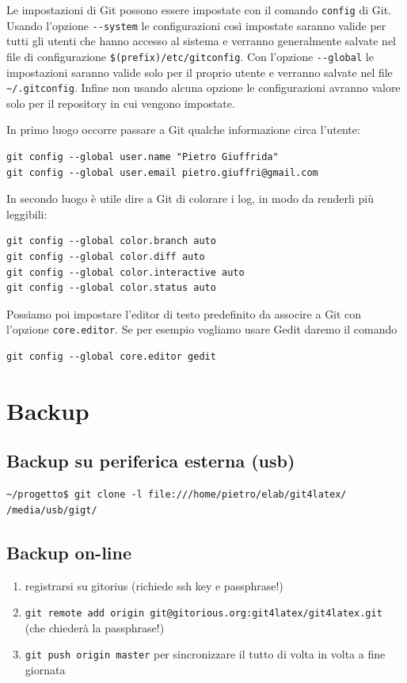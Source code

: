 \documentclass[a4paper,12pt,oneside]{article}
\begin{document}
Le impostazioni di Git possono essere impostate con il comando
\lstinline|config| di Git. Usando l'opzione \lstinline|--system| le configurazioni
così impostate saranno valide per tutti gli utenti che hanno accesso al sistema
e verranno generalmente salvate nel file di configurazione
\lstinline|$(prefix)/etc/gitconfig|. Con l'opzione \lstinline|--global| le impostazioni
saranno valide solo per il proprio utente e verranno salvate nel file
\lstinline|~/.gitconfig|. Infine non usando alcuna opzione le configurazioni
avranno valore solo per il repository in cui vengono impostate.

In primo luogo occorre passare a Git qualche informazione circa l'utente:
\begin{lstlisting}
git config --global user.name "Pietro Giuffrida"
git config --global user.email pietro.giuffri@gmail.com
\end{lstlisting}
In secondo luogo è utile dire a Git di colorare i log, in modo da renderli più
leggibili:
\begin{lstlisting}
git config --global color.branch auto
git config --global color.diff auto
git config --global color.interactive auto
git config --global color.status auto
\end{lstlisting}
Possiamo poi impostare l'editor di testo predefinito da associre a Git con
l'opzione \lstinline|core.editor|. Se per esempio vogliamo usare Gedit daremo
il comando
\begin{lstlisting}
git config --global core.editor gedit
\end{lstlisting}

\section{Backup}
\subsection{Backup su periferica esterna (usb)}
\begin{lstlisting}
~/progetto$ git clone -l file:///home/pietro/elab/git4latex/ /media/usb/gigt/
\end{lstlisting}

\subsection{Backup on-line}

\begin{enumerate}
\item registrarsi su gitorius (richiede ssh key e passphrase!)
\item \lstinline|git remote add origin git@gitorious.org:git4latex/git4latex.git|
  (che chiederà la passphrase!)
\item \lstinline|git push origin master|
  per sincronizzare il tutto di volta in volta a fine giornata
\end{enumerate}
\end{document}
